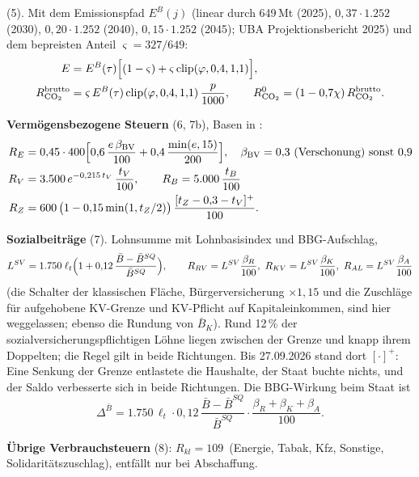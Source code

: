 \textbf{\COz} (5). Mit dem Emissionspfad $E^B(j)$ (linear durch 649\,Mt (2025),
$0{,}37\cdot1.252$ (2030), $0{,}20\cdot1.252$ (2040), $0{,}15\cdot1.252$ (2045); UBA
Projektionsbericht 2025) und dem bepreisten Anteil $\varsigma=327/649$:
\begin{align}
E&=E^B(\tau)\Bigl[(1-\varsigma)+\varsigma\operatorname{clip}(\varphi,0{,}4,1{,}1)\Bigr],\\
R^{\text{brutto}}_{\text{CO}_2}&=\varsigma\,E^B(\tau)\operatorname{clip}(\varphi,0{,}4,1{,}1)\,\frac{p}{1000},\qquad
R^0_{\text{CO}_2}=(1-0{,}7\chi)\,R^{\text{brutto}}_{\text{CO}_2}.
\end{align}

\textbf{Vermögensbezogene Steuern} (6, 7b), Basen in \Mrd:
\begin{align}
R_E&=0{,}45\cdot400\Bigl[0{,}6\,\frac{e\,\beta_{\text{BV}}}{100}+0{,}4\,\frac{\min(e,15)}{200}\Bigr],\quad \beta_{\text{BV}}=0{,}3\ \text{(Verschonung) sonst }0{,}9\\
R_V&=3.500\,e^{-0{,}215\,t_V}\,\frac{t_V}{100},\qquad R_B=5.000\,\frac{t_B}{100}\\
R_Z&=600\,\bigl(1-0{,}15\min(1,t_Z/2)\bigr)\,\frac{[t_Z-0{,}3-t_V]^+}{100}.
\end{align}

\textbf{Sozialbeiträge} (7). Lohnsumme mit Lohnbasisindex und BBG-Aufschlag,
\begin{equation}
L^{SV}=1.750\;\ell_t\Bigl(1+0{,}12\,\frac{\bar B-\bar B^{SQ}}{\bar B^{SQ}}\Bigr),\qquad
R_{RV}=L^{SV}\frac{\beta_R}{100},\ R_{KV}=L^{SV}\frac{\beta_K}{100},\ R_{AL}=L^{SV}\frac{\beta_A}{100}
\end{equation}
(die Schalter der klassischen Fläche, Bürgerversicherung $\times1{,}15$ und die Zuschläge für
aufgehobene KV-Grenze und KV-Pflicht auf Kapitaleinkommen, sind hier weggelassen; ebenso die
Rundung von $\bar B_K$). Rund 12\,\% der sozialversicherungspflichtigen Löhne liegen zwischen der
Grenze und knapp ihrem Doppelten; die Regel gilt in beide Richtungen. Bis 27.09.2026 stand dort
$[\cdot]^+$: Eine Senkung der Grenze entlastete die Haushalte, der Staat buchte nichts, und der
Saldo verbesserte sich in beide Richtungen. Die BBG-Wirkung beim Staat ist
\begin{equation}
\Delta^{\bar B}=1.750\,\ell_t\cdot0{,}12\,\frac{\bar B-\bar B^{SQ}}{\bar B^{SQ}}\cdot\frac{\beta_R+\beta_K+\beta_A}{100}.
\end{equation}

\textbf{Übrige Verbrauchsteuern} (8): $R_{kl}=109$\,\Mrd{} (Energie, Tabak, Kfz, Sonstige,
Solidaritätszuschlag), entfällt nur bei Abschaffung.

